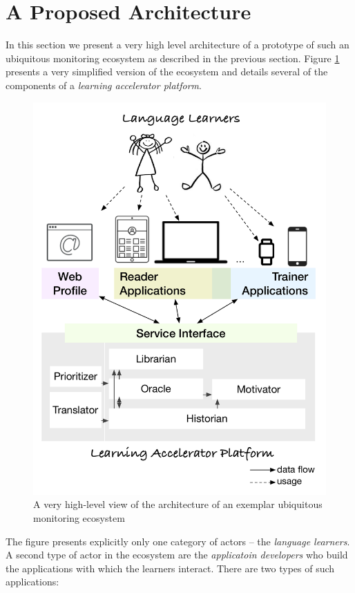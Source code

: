 

\section {A Proposed Architecture}
In this section we present a very high level architecture of a prototype of such an ubiquitous monitoring ecosystem as described in the previous section. 
Figure \ref{fig:architecture} presents a very simplified version of the ecosystem and details several of the components of a {\em learning accelerator platform}.

\begin{figure}[h!]
	\includegraphics[width=0.9\linewidth]{images/zeeguu-architecture.pdf}
	\caption{A very high-level view of the architecture of an exemplar ubiquitous monitoring ecosystem}
	\label{fig:architecture}
\end{figure}

The figure presents explicitly only one category of actors -- the {\em language learners}. A second type of actor in the ecosystem are the {\em applicatoin developers} who build the applications with which the learners interact. There are two types of such applications: 

